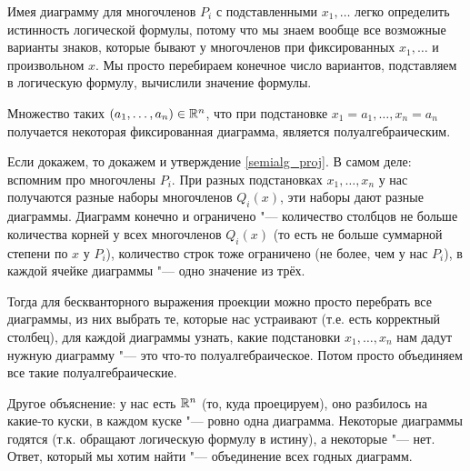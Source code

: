 	\begin{Rem}
		Имея диаграмму для многочленов $P_i$ с подставленными $x_1, \dots$ легко определить истинность логической формулы, потому что мы знаем вообще все возможные варианты знаков,
		которые бывают у многочленов при фиксированных $x_1, \dots$ и произвольном $x$.
		Мы просто перебираем конечное число вариантов, подставляем в логическую формулу, вычислили значение формулы.
	\end{Rem}

	\begin{assertion}\label{fix_diag_semialg}
		Множество таких $(a_1, \dots, a_n) \in \mathbb{R}^n$, что при подстановке $x_1=a_1, \dots, x_n=a_n$ получается некоторая фиксированная диаграмма, является полуалгебраическим.
	\end{assertion}
	\begin{Rem}
		Если докажем, то докажем и утверждение \ref{semialg_proj}.
		В самом деле: вспомним про многочлены $P_i$.
		При разных подстановках $x_1, \dots, x_n$ у нас получаются разные наборы многочленов $Q_i(x)$, эти наборы дают разные диаграммы.
		Диаграмм конечно и ограничено "--- количество столбцов не больше количества корней у всех многочленов $Q_i(x)$ (то есть не больше суммарной степени по $x$ у $P_i$),
		количество строк тоже ограничено (не более, чем у нас $P_i$), в каждой ячейке диаграммы "--- одно значение из трёх.

		Тогда для бескванторного выражения проекции можно просто перебрать все диаграммы, из них выбрать те, которые нас устраивают (т.е. есть корректный столбец),
		для каждой диаграммы узнать, какие подстановки $x_1, \dots, x_n$ нам дадут нужную диаграмму "--- это что-то полуалгебраическое.
		Потом просто объединяем все такие полуалгебраические.
	\end{Rem}
	\begin{Rem}
		Другое объяснение: у нас есть $\mathbb{R}^n$ (то, куда проецируем), оно разбилось на какие-то куски, в каждом куске "--- ровно одна диаграмма.
		Некоторые диаграммы годятся (т.к. обращают логическую формулу в истину), а некоторые "--- нет.
		Ответ, который мы хотим найти "--- объединение всех годных диаграмм.
	\end{Rem}


